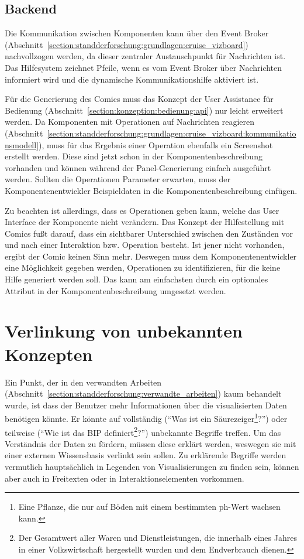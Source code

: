 \documentclass[
	headsepline,
	footsepline,
	fontsize=12pt,
	bibliography=totoc
]{scrbook}
\begin{document}
\subsection{Backend}
\label{section:konzeption:kommunikation:backend}

Die Kommunikation zwischen Komponenten kann über den Event Broker (Abschnitt~\ref{section:standderforschung:grundlagen:cruise_vizboard}) nachvollzogen werden, da dieser zentraler Austauschpunkt für Nachrichten ist. Das Hilfesystem zeichnet Pfeile, wenn es vom Event Broker über Nachrichten informiert wird und die dynamische Kommunikationshilfe aktiviert ist.

Für die Generierung des Comics muss das Konzept der User Assistance für Bedienung (Abschnitt~\ref{section:konzeption:bedienung:api}) nur leicht erweitert werden. Da Komponenten mit Operationen auf Nachrichten reagieren (Abschnitt~\ref{section:standderforschung:grundlagen:cruise_vizboard:kommunikationsmodell}), muss für das Ergebnis einer Operation ebenfalls ein Screenshot erstellt werden. Diese sind jetzt schon in der Komponentenbeschreibung vorhanden und können während der Panel-Generierung einfach ausgeführt werden. Sollten die Operationen Parameter erwarten, muss der Komponentenentwickler Beispieldaten in die Komponentenbeschreibung einfügen.

Zu beachten ist allerdings, dass es Operationen geben kann, welche das User Interface der Komponente nicht verändern. Das Konzept der Hilfestellung mit Comics fußt darauf, dass ein sichtbarer Unterschied zwischen den Zuständen vor und nach einer Interaktion bzw. Operation besteht. Ist jener nicht vorhanden, ergibt der Comic keinen Sinn mehr. Deswegen muss dem Komponentenentwickler eine Möglichkeit gegeben werden, Operationen zu identifizieren, für die keine Hilfe generiert werden soll. Das kann am einfachsten durch ein optionales Attribut in der Komponentenbeschreibung umgesetzt werden.

\section{Verlinkung von unbekannten Konzepten}
\label{section:konzeption:verlinkung}


Ein Punkt, der in den verwandten Arbeiten (Abschnitt~\ref{section:standderforschung:verwandte_arbeiten}) kaum behandelt wurde, ist dass der Benutzer mehr Informationen über die visualisierten Daten benötigen könnte. Er könnte auf vollständig (\enquote{Was ist ein Säurezeiger\footnote{Eine Pflanze, die nur auf Böden mit einem bestimmten ph-Wert wachsen kann.}?}) oder teilweise (\enquote{Wie ist das BIP definiert\footnote{Der Gesamtwert aller Waren und Dienstleistungen, die innerhalb eines Jahres in einer Volkswirtschaft hergestellt wurden und dem Endverbrauch dienen.}?}) unbekannte Begriffe treffen. Um das Verständnis der Daten zu fördern, müssen diese erklärt werden, weswegen sie mit einer externen Wissensbasis verlinkt sein sollen. Zu erklärende Begriffe werden vermutlich hauptsächlich in Legenden von Visualisierungen zu finden sein, können aber auch in Freitexten oder in Interaktionselementen vorkommen.
\end{document}
